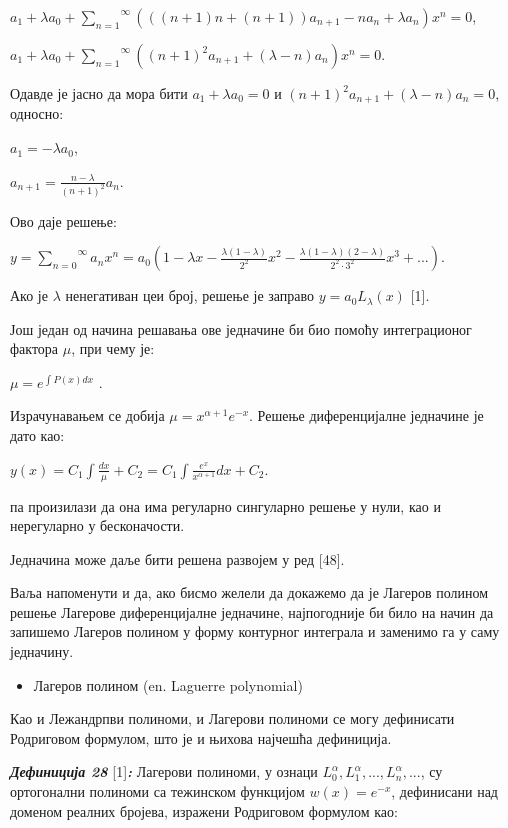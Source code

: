 \(a_{1} + \lambda a_{0} + \overset{\infty}{\sum_{n = 1}}(((n + 1)n + (n + 1))a_{n + 1} - na_{n} + \lambda a_{n})x^{n} = 0\),

\(a_{1} + \lambda a_{0} + \overset{\infty}{\sum_{n = 1}}({(n + 1)}^{2}a_{n + 1} + (\lambda - n)a_{n})x^{n} = 0\).

Одавде је јасно да мора бити \(a_{1} + \lambda a_{0} = 0\) и
\({(n + 1)}^{2}a_{n + 1} + (\lambda - n)a_{n} = 0\), односно:

\(a_{1} = - \lambda a_{0}\),

\(a_{n + 1} = \frac{n - \lambda}{{(n + 1)}^{2}}a_{n}\).

Ово даје решење:

\(y = \overset{\infty}{\sum_{n = 0}}a_{n}x^{n} = a_{0}(1 - \lambda x - \frac{\lambda(1 - \lambda)}{2^{2}}x^{2} - \frac{\lambda(1 - \lambda)(2 - \lambda)}{2^{2} \cdot 3^{2}}x^{3} + ...)\).

Ако је \(\lambda\) ненегативан цеи број, решење је заправо
\(y = a_{0}L_{\lambda}(x)\) {[}1{]}.

Још један од начина решавања ове једначине би био помоћу интеграционог
фактора \(\mu\), при чему је:

\(\mu = e^{\int P(x)dx}\) .

Израчунавањем се добија \(\mu = x^{\alpha + 1}e^{- x}\). Решење
диференцијалне једначине је дато као:

\(y(x) = C_{1}\int\frac{dx}{\mu} + C_{2} = C_{1}\int\frac{e^{x}}{x^{\alpha + 1}}dx + C_{2}\).

па произилази да она има регуларно сингуларно решење у нули, као и
нерегуларно у бесконачости.

Једначина може даље бити решена развојем у ред {[}48{]}.

Ваља напоменути и да, ако бисмо желели да докажемо да је Лагеров полином
решење Лагерове диференцијалне једначине, најпогодније би било на начин
да запишемо Лагеров полином у форму контурног интеграла и заменимо га у
саму једначину.

\begin{itemize}
\item
  Лагеров полином (en. Laguerre polynomial)
\end{itemize}

Као и Лежандрпви полиноми, и Лагерови полиноми се могу дефинисати
Родриговом формулом, што је и њихова најчешћа дефиниција.

\emph{\textbf{Дефиниција 28}} {[}1{]}\emph{\textbf{:}} Лагерови
полиноми, у ознаци
\(L_{0}^{\alpha},L_{1}^{\alpha},...,L_{n}^{\alpha},...\), су ортогонални
полиноми са тежинском функцијом \(w(x) = e^{- x}\), дефинисани над
доменом реалних бројева, изражени Родриговом формулом као:

